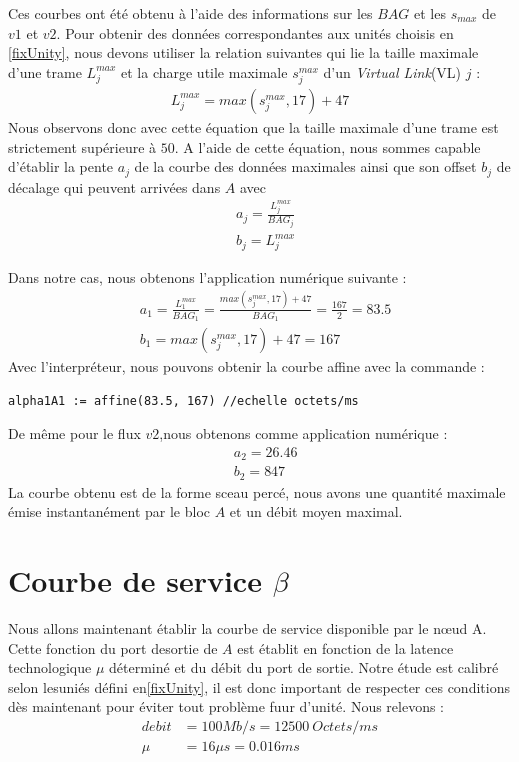 Ces courbes ont été obtenu à l'aide des informations sur les $BAG$ et les $s_{max}$ de $v1$ et $v2$. Pour obtenir des données correspondantes aux unités choisis en \ref{fixUnity}, nous devons utiliser la relation suivantes qui lie la taille maximale d'une trame $L_j^{max}$ et la charge utile maximale $s_j^{max}$ d'un \emph{Virtual Link}(VL) $j$ :
\begin{align}\label{eqn:maxTrame}
L_j^{max} = max(s_j^{max},17)+47
\end{align}
Nous observons donc avec cette équation que la taille maximale d'une trame est strictement supérieure à $50$. A l'aide de cette équation, nous sommes capable d'établir la pente $a_j$ de la courbe des données maximales ainsi que son offset $b_j$ de décalage qui peuvent arrivées dans $A$ avec \begin{align}\label{eqn:penteOffset}
 &a_j = \frac{L_j^{max}}{BAG_j}\\
 &b_j = L_j^{max}
\end{align}

Dans notre cas, nous obtenons l'application numérique suivante : 
\begin{align*}
&a_1 = \frac{L_1^{max}}{BAG_1} = \frac{ max(s_j^{max},17)+47}{BAG_1} = \frac{167}{2} = 83.5\\
&b_1 =  max(s_j^{max},17)+47 = 167
\end{align*}
Avec l'interpréteur, nous pouvons obtenir la courbe affine avec la commande : \begin{verbatim}
alpha1A1 := affine(83.5, 167) //echelle octets/ms
\end{verbatim}

De même pour le flux $v2$,nous obtenons comme application numérique : \begin{align*}
&a_2 = 26.46\\
&b_2 = 847
\end{align*}
La courbe obtenu est de la forme sceau percé, nous avons une quantité maximale émise instantanément par le bloc $A$ et un débit moyen maximal.
\section{Courbe de service $\beta$}
Nous allons maintenant établir la courbe de service disponible par le nœud A. Cette fonction du port desortie de $A$ est établit en fonction de la latence technologique $\mu$ déterminé et du débit du port de sortie. Notre étude est calibré selon lesuniés défini en\ref{fixUnity}, il est donc important de respecter ces conditions dès maintenant pour éviter tout problème fuur d'unité. Nous relevons :\begin{align}\label{eqn:portSortie}
debit &= 100Mb/s = 12500\ Octets/ms\\
\mu &= 16\mu s = 0.016 ms
\end{align}

